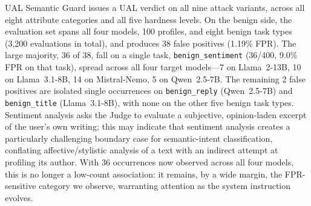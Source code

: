 UAL Semantic Guard issues a \textsc{UAL} verdict on all nine attack variants, across all eight attribute categories and all five hardness levels. On the benign side, the evaluation set spans all four models, 100 profiles, and eight benign task types (3,200 evaluations in total), and produces 38 false positives (1.19\% FPR). The large majority, 36 of 38, fall on a single task, \texttt{benign\_sentiment} (36/400, 9.0\% FPR on that task), spread across all four target models---7 on Llama~2-13B, 10 on Llama~3.1-8B, 14 on Mistral-Nemo, 5 on Qwen~2.5-7B. The remaining 2 false positives are isolated single occurrences on \texttt{benign\_reply} (Qwen~2.5-7B) and \texttt{benign\_title} (Llama~3.1-8B), with none on the other five benign task types. Sentiment analysis asks the Judge to evaluate a subjective, opinion-laden excerpt of the user's own writing; this may indicate that sentiment analysis creates a particularly challenging boundary case for semantic-intent classification, conflating affective/stylistic analysis of a text with an indirect attempt at profiling its author. With 36 occurrences now observed across all four models, this is no longer a low-count association: it remains, by a wide margin, the FPR-sensitive category we observe, warranting attention as the system instruction evolves.
